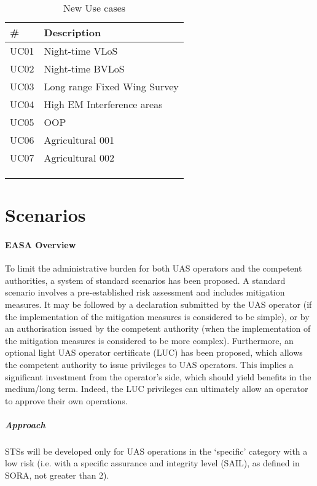 \documentclass{ua_wgs_base}
\begin{document}
\begin{center}
\begin{table}[tbh]
\small
\ttfamily
\centering{}%
\begin{tabular}{|l|l|}
\hline 
\textbf{\#} & \textbf{Description}\tabularnewline
\hline 
\hline 
UC01 & Night-time VLoS\tabularnewline
\hline 
UC02 & Night-time BVLoS\tabularnewline
\hline 
UC03 & Long range Fixed Wing Survey\tabularnewline
\hline 
UC04 & High EM Interference areas\tabularnewline
\hline 
UC05 & OOP\tabularnewline
\hline 
UC06 & Agricultural 001\tabularnewline
\hline 
UC07 & Agricultural 002\tabularnewline
\hline 
 & \tabularnewline
\hline 
 & \tabularnewline
\hline 
 & \tabularnewline
\hline 
\end{tabular}\caption{New Use cases\label{tab:new-use-cases}}
\end{table}
\par\end{center}

\section{Scenarios}

\paragraph{EASA Overview}

To limit the administrative burden for both UAS operators and the
competent authorities, a system of standard scenarios has been proposed.
A standard scenario involves a pre-established risk assessment and
includes mitigation measures. It may be followed by a declaration
submitted by the UAS operator (if the implementation of the mitigation
measures is considered to be simple), or by an authorisation issued
by the competent authority (when the implementation of the mitigation
measures is considered to be more complex). Furthermore, an optional
light UAS operator certificate (LUC) has been proposed, which allows
the competent authority to issue privileges to UAS operators. This
implies a significant investment from the operator\textquoteright s
side, which should yield benefits in the medium/long term. Indeed,
the LUC privileges can ultimately allow an operator to approve their
own operations.

\subparagraph{Approach}

STSs will be developed only for UAS operations in the \textquoteleft specific\textquoteright{}
category with a low risk (i.e. with a specific assurance and integrity
level (SAIL), as defined in SORA, not greater than 2).
\end{document}
